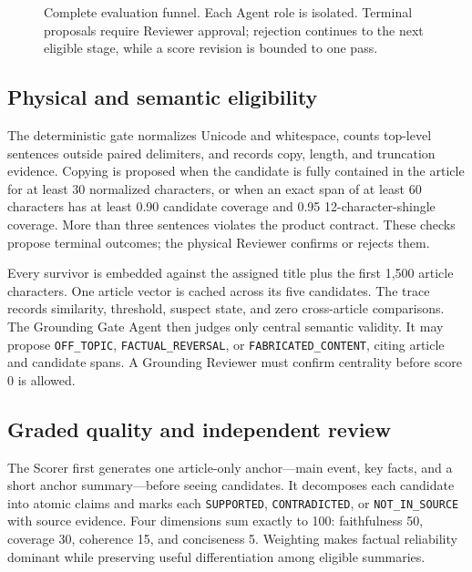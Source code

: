 \documentclass[conference]{IEEEtran}
\begin{document}
\begin{figure}[t]
{}
\caption{Complete evaluation funnel. Each Agent role is isolated. Terminal proposals require Reviewer approval; rejection continues to the next eligible stage, while a score revision is bounded to one pass.}
\label{fig:funnel}
\end{figure}

\subsection{Physical and semantic eligibility}
The deterministic gate normalizes Unicode and whitespace, counts top-level sentences outside paired delimiters, and records copy, length, and truncation evidence. Copying is proposed when the candidate is fully contained in the article for at least 30 normalized characters, or when an exact span of at least 60 characters has at least 0.90 candidate coverage and 0.95 12-character-shingle coverage. More than three sentences violates the product contract. These checks propose terminal outcomes; the physical Reviewer confirms or rejects them.

Every survivor is embedded against the assigned title plus the first 1,500 article characters. One article vector is cached across its five candidates. The trace records similarity, threshold, suspect state, and zero cross-article comparisons. The Grounding Gate Agent then judges only central semantic validity. It may propose \texttt{OFF\_TOPIC}, \texttt{FACTUAL\_REVERSAL}, or \texttt{FABRICATED\_CONTENT}, citing article and candidate spans. A Grounding Reviewer must confirm centrality before score 0 is allowed.

\subsection{Graded quality and independent review}
The Scorer first generates one article-only anchor---main event, key facts, and a short anchor summary---before seeing candidates. It decomposes each candidate into atomic claims and marks each \texttt{SUPPORTED}, \texttt{CONTRADICTED}, or \texttt{NOT\_IN\_SOURCE} with source evidence. Four dimensions sum exactly to 100: faithfulness 50, coverage 30, coherence 15, and conciseness 5. Weighting makes factual reliability dominant while preserving useful differentiation among eligible summaries.
\end{document}
